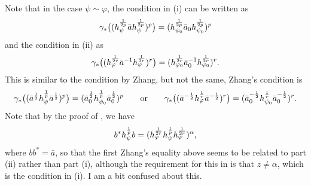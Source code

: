 \documentclass[12pt]{article}
\theoremstyle{definition}
\theoremstyle{remark}
\numberwithin{equation}{section}
\def\ffi{\varphi}
\begin{document}
{\color{red} 
Note that in the case $\psi\sim\ffi$, the condition in (i) can be written as 
\[
\gamma_*\bigl((h_\psi^{1\over 2p}\bar a h_\psi^{1\over 2p})^p\bigr)=(h_{\psi_0}^{1\over
2p}\bar a_0 h_{\psi_0}^{1\over 2p})^p
\]
and the condition in (ii) as 
\[
\gamma_*\bigl((h_\ffi^{1\over 2r}\bar a^{-1}h_\ffi^{1\over
2r})^r\bigr)=(h_{\ffi_0}^{1\over 2r}\bar a_0^{-1}h_{\ffi_0}^{1\over 2r})^r.
\]
This is similar to the condition by Zhang, but not the same, Zhang's condition is
\[
\gamma_*\bigl((\bar a^{\frac12}h_\psi^{1\over p}\bar a^{\frac12})^p\bigr)=(\bar
a_0^{\frac12}h_{\psi_0}^{1\over
p}\bar a_0^{\frac12})^p\qquad \text{or}\qquad \gamma_*\bigl((\bar
a^{-\frac12}h_\ffi^{1\over r}\bar a^{-\frac12})^r\bigr)=(\bar
a_0^{-\frac12}h_{\psi_0}^{1\over
r}\bar a_0^{-\frac12})^r.
\]
Note that by the proof of \cite[Thm. 1 (vi)]{kato2023onrenyi}, we have 
\[
b^*h_\psi^{1\over p}b=(h_\ffi^{1\over 2r}h_\psi^{1\over p}h_\ffi^{1\over 2r})^\alpha,
\]
where $bb^*=\bar a$, so that the first Zhang's equality above  seems to be related to part (ii)
rather than part (i), although the requirement for this in \cite[Thm. 1.2
(iii)]{zhang2020equality} is that $z\ne \alpha$, which is the condition in (i). I am a bit
confused about this.

}
\end{document}
